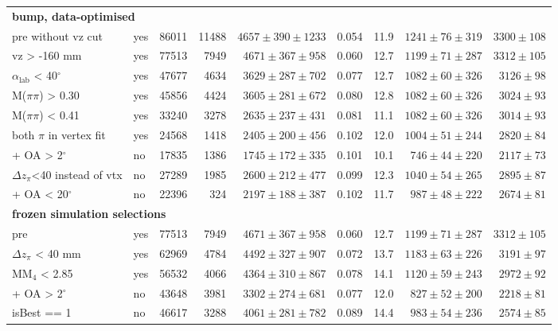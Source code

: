 \begin{table}[H]
\begin{tabular}{llrrrrrrr}
\midrule
\multicolumn{9}{l}{\textbf{bump, data-optimised}} \\
pre without vz cut & yes & 86011 & 11488 & $4657\pm390\pm1233$ & 0.054 & 11.9 & $1241\pm76\pm319$ & $3300\pm108$ \\
vz > -160 mm & yes & 77513 & 7949 & $4671\pm367\pm958$ & 0.060 & 12.7 & $1199\pm71\pm287$ & $3312\pm105$ \\
$\alpha_\mathrm{lab}$ < 40$^\circ$ & yes & 47677 & 4634 & $3629\pm287\pm702$ & 0.077 & 12.7 & $1082\pm60\pm326$ & $3126\pm98$ \\
M($\pi\pi$) > 0.30 & yes & 45856 & 4424 & $3605\pm281\pm672$ & 0.080 & 12.8 & $1082\pm60\pm326$ & $3024\pm93$ \\
M($\pi\pi$) < 0.41 & yes & 33240 & 3278 & $2635\pm237\pm431$ & 0.081 & 11.1 & $1082\pm60\pm326$ & $3014\pm93$ \\
both $\pi$ in vertex fit & yes & 24568 & 1418 & $2405\pm200\pm456$ & 0.102 & 12.0 & $1004\pm51\pm244$ & $2820\pm84$ \\
+ OA > 2$^\circ$ & no & 17835 & 1386 & $1745\pm172\pm335$ & 0.101 & 10.1 & $746\pm44\pm220$ & $2117\pm73$ \\
$\Delta z_\pi$<40 instead of vtx & no & 27289 & 1985 & $2600\pm212\pm477$ & 0.099 & 12.3 & $1040\pm54\pm265$ & $2895\pm87$ \\
+ OA < 20$^\circ$ & no & 22396 & 324 & $2197\pm188\pm387$ & 0.102 & 11.7 & $987\pm48\pm222$ & $2674\pm81$ \\
\midrule
\multicolumn{9}{l}{\textbf{frozen simulation selections}} \\
pre & yes & 77513 & 7949 & $4671\pm367\pm958$ & 0.060 & 12.7 & $1199\pm71\pm287$ & $3312\pm105$ \\
$\Delta z_\pi$ < 40 mm & yes & 62969 & 4784 & $4492\pm327\pm907$ & 0.072 & 13.7 & $1183\pm63\pm226$ & $3191\pm97$ \\
MM$_4$ < 2.85 & yes & 56532 & 4066 & $4364\pm310\pm867$ & 0.078 & 14.1 & $1120\pm59\pm243$ & $2972\pm92$ \\
+ OA > 2$^\circ$ & no & 43648 & 3981 & $3302\pm274\pm681$ & 0.077 & 12.0 & $827\pm52\pm200$ & $2218\pm81$ \\
isBest == 1 & no & 46617 & 3288 & $4061\pm281\pm782$ & 0.089 & 14.4 & $983\pm54\pm236$ & $2574\pm85$ \\
\bottomrule
\end{tabular}
\end{table}
